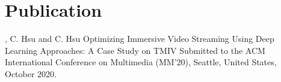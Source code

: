 
\section{Publication}


\begin{thebibliography}{5}

, C. Hsu and C. Hsu
\newblock Optimizing Immersive Video Streaming Using Deep Learning Approaches: A Case Study on TMIV
\newblock Submitted to the ACM International Conference on Multimedia (MM’20), Seattle, United States, October 2020.



\end{thebibliography}

